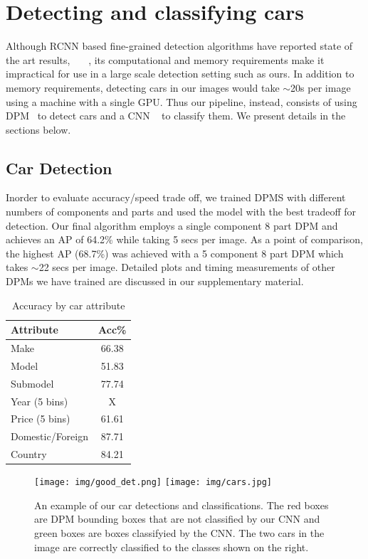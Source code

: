 \documentclass[10pt,twocolumn,letterpaper]{article}
\begin{document}
\section{Detecting and classifying cars}
\label{sec:detection}
Although RCNN based fine-grained detection algorithms have reported state of the art results, ~\cite{rcnn}~\cite{ning}~\cite{branson}, its computational and memory requirements make it impractical for use in a large scale detection setting such as ours. In addition to memory requirements, detecting cars in our images would take \(\sim\)20s per image using a machine with a single GPU. Thus our pipeline, instead, consists of using DPM~\cite{dpm} to detect cars and a CNN ~\cite{alexnet} to classify them. We present details in the sections below.

\subsection{Car Detection}
Inorder to evaluate accuracy/speed trade off, we trained DPMS with different numbers of components and parts and used the model with the best tradeoff for detection. Our final algorithm employs a single component 8 part DPM and achieves an AP of 64.2\% while taking 5 secs per image. As a point of comparison, the highest AP (68.7\%) was achieved with a 5 component 8 part DPM which takes \(\sim\)22 secs per image. Detailed plots and timing measurements of other DPMs we have trained are discussed in our supplementary material.


\begin{table}
\begin{center}
\begin{tabular}{|l|c|}
\hline
\textbf{Attribute} & \textbf{Acc\%} \\
\hline\hline
Make & 66.38 \\
Model & 51.83 \\
Submodel & 77.74 \\
Year (5 bins) & X \\
Price (5 bins)& 61.61 \\
Domestic/Foreign & 87.71\\
Country & 84.21\\
\hline
\end{tabular}
\end{center}
\caption{Accuracy by car attribute}
\label{table:tree-acc}
\end{table}

\begin{figure} [t]
\begin{center}
\texttt{[image: img/good\_det.png]}
\raisebox{-0.02\height}
 {
\texttt{[image: img/cars.jpg]}
 }
\end{center}
\caption {An example of our car detections and classifications. The red boxes are DPM bounding boxes that are not classified by our CNN and green boxes are boxes classifyied by the CNN. The two cars in the image are correctly classified to the classes shown on the right.}
\label{fig:dets}
\end{figure}
\end{document}
